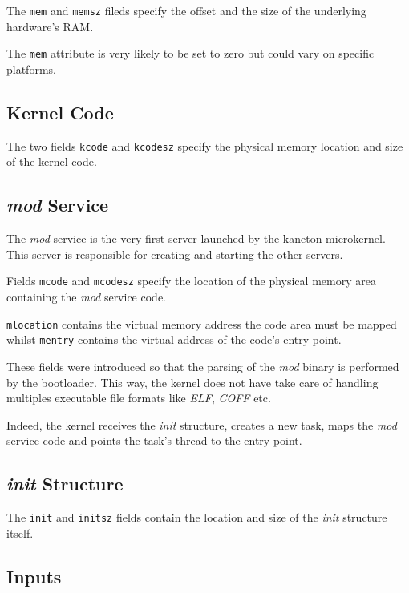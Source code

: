 The \texttt{mem} and \texttt{memsz} fileds specify the offset and the size of
the underlying hardware's RAM.

The \texttt{mem} attribute is very likely to be set to zero but could
vary on specific platforms.


\subsection*{Kernel Code}

The two fields \texttt{kcode} and \texttt{kcodesz} specify the physical memory
location and size of the kernel code.


\subsection*{\textit{mod} Service}

The \textit{mod} service is the very first server launched by the kaneton
microkernel. This server is responsible for creating and starting the
other servers.

Fields \texttt{mcode} and \texttt{mcodesz} specify the location of the physical
memory area containing the \textit{mod} service code.

\texttt{mlocation} contains the virtual memory address the code area must
be mapped whilst \texttt{mentry} contains the virtual address of the code's
entry point.

These fields were introduced so that the parsing of the \textit{mod} binary
is performed by the bootloader. This way, the kernel does not have take
care of handling multiples executable file formats like \textit{ELF},
\textit{COFF} etc.

Indeed, the kernel receives the \textit{init} structure, creates a new task,
maps the \textit{mod} service code and points the task's thread to the
entry point.


\subsection*{\textit{init} Structure}

The \texttt{init} and \texttt{initsz} fields contain the location and size
of the \textit{init} structure itself.


\subsection*{Inputs}

